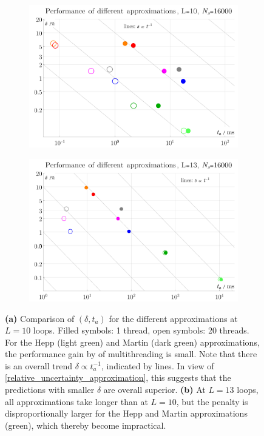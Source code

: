 \documentclass[11pt]{scrartcl}
\numberwithin{equation}{section}
\begin{document}
\begin{figure}[htb]
	
	\begin{subfigure}{ .49 \linewidth}
		\centering
		\includegraphics[width=\linewidth]{figures/performance_L10}
		\subcaption{}
		\label{fig:performance_L10}
	\end{subfigure}
	\begin{subfigure}{ .49 \linewidth}
		\centering
		\includegraphics[width=\linewidth]{figures/performance_L13}
		\subcaption{}
		\label{fig:performance_L13}
	\end{subfigure}
	\caption{ 
		\textbf{(a)} Comparison of $(\delta, t_a)$ for the different approximations at $L=10$ loops. Filled symbols: 1 thread, open symbols: 20 threads. For the Hepp (light green) and Martin (dark green) approximations, the performance gain by of multithreading is small. Note that there is an overall trend $\delta \propto t_a^{-1}$, indicated by lines. In view of \cref{relative_uncertainty_approximation}, this suggests that the predictions with smaller $\delta$ are overall superior.  
		\textbf{(b)} At $L=13$ loops, all approximations take longer than at $L=10$, but the penalty is disproportionally larger for the Hepp and Martin approximations (green), which thereby become impractical.  }
	\label{fig:performance}
\end{figure}
\end{document}
